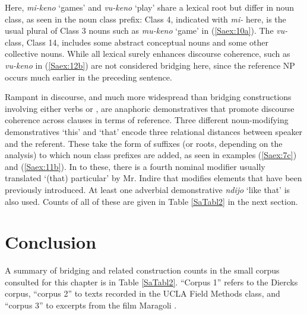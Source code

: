 \documentclass[output=paper]{LSP/langsci}
\begin{document}
Here, \textit{mi-keno} `games' and \textit{vu-keno} `play' share a lexical root but differ in noun class, as seen in the noun class prefix: Class 4, indicated with \textit{mi-}  here, is the usual plural of Class 3 nouns such as \textit{mu-keno} `game' in (\ref{Saex:10a}). The \textit{vu-} class, Class 14, includes some abstract conceptual nouns and some other collective nouns. While all lexical  surely enhances discourse coherence,  such as \textit{vu-keno} in (\ref{Saex:12b}) are not considered bridging  here, since the reference NP occurs much earlier in the preceding sentence.

Rampant in  discourse, and much more widespread than bridging constructions involving either verbs or , are anaphoric demonstratives that promote discourse coherence across clauses in terms of reference. Three different noun-modifying demonstratives `this' and `that' encode three relational distances between speaker and the referent. These take the form of suffixes (or roots, depending on the analysis) to which noun class prefixes are added, as seen in examples (\ref{Saex:7c}) and (\ref{Saex:11b}). In  to these, there is a fourth nominal modifier usually translated `(that) particular' by Mr. Indire that modifies elements that have been previously introduced. At least one adverbial demonstrative \textit{ndijo} `like that' is also used. Counts of all of these are given in Table \ref{SaTabl2} in the next section.
%
\section{Conclusion}
\label{Saconcl}
A summary of bridging and related construction counts in the small corpus consulted for this chapter is in Table \ref{SaTabl2}. ``Corpus 1'' refers to the Diercks corpus, ``corpus 2'' to texts recorded in the UCLA Field Methods class, and ``corpus 3'' to excerpts from the film Maragoli \citep{Nichols1976}.
\end{document}
